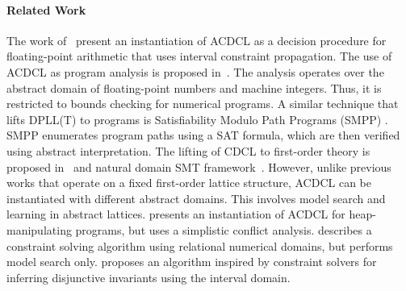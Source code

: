 \paragraph{Related Work}
The work of~\cite{sas13,DBLP:journals/fmsd/BrainDGHK14} present an
instantiation of ACDCL as a decision procedure for floating-point
arithmetic that uses interval constraint propagation.  
%
The use of
ACDCL as program analysis is proposed in~\cite{tacas12}.  The analysis
operates over the abstract domain of floating-point numbers and
machine integers.  Thus, it is restricted to bounds checking for
numerical programs.  
%
A similar technique that lifts DPLL(T) to
programs is Satisfiability Modulo Path Programs (SMPP) \cite{SMPP}. SMPP
enumerates program paths using a SAT formula, which are then verified
using abstract interpretation.  
%
The lifting of CDCL to first-order theory is proposed
in~\cite{dpll,cp09} and natural domain SMT framework~\cite{ndsmt}.
 However, unlike
previous works that operate on a fixed first-order lattice structure,
ACDCL can be instantiated with different abstract domains.  This
involves model search and learning in abstract lattices.   
%
\cite{DBLP:journals/fmsd/BrainDGHK14} presents an instantiation of ACDCL for heap-manipulating programs, but uses a simplistic conflict analysis.
%
\cite{DBLP:conf/vmcai/PelleauMTB13} describes a constraint solving algorithm using relational numerical domains, but performs model search only.
%
\cite{DBLP:conf/esop/MineBR16} proposes an algorithm inspired by constraint solvers for inferring disjunctive invariants using the interval domain.


